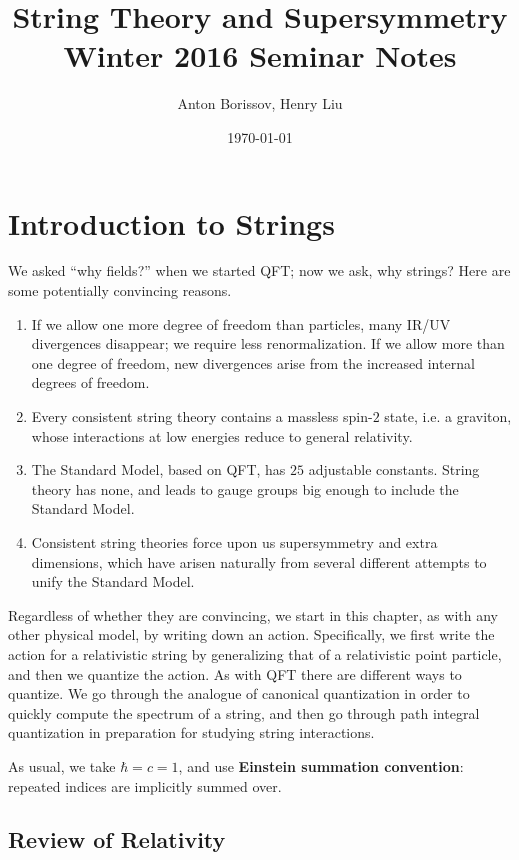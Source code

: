 \documentclass{report}
\title{String Theory and Supersymmetry\\Winter 2016 Seminar Notes}
\author{Anton Borissov, Henry Liu}
\date{\today}
\theoremstyle{plain}
\theoremstyle{definition}
\theoremstyle{remark}
\begin{document}
\hypersetup{pageanchor=false}
\maketitle
\hypersetup{pageanchor=true}

\tableofcontents

\chapter{Introduction to Strings}

We asked ``why fields?'' when we started QFT; now we ask, why strings?
Here are some potentially convincing reasons.
\begin{enumerate}
\item If we allow one more degree of freedom than particles, many
  IR/UV divergences disappear; we require less renormalization. If we
  allow more than one degree of freedom, new divergences arise from
  the increased internal degrees of freedom.
\item Every consistent string theory contains a massless spin-$2$
  state, i.e. a graviton, whose interactions at low energies reduce to
  general relativity.
\item The Standard Model, based on QFT, has $25$ adjustable constants.
  String theory has none, and leads to gauge groups big enough to
  include the Standard Model.
\item Consistent string theories force upon us supersymmetry and
  extra dimensions, which have arisen naturally from several different
  attempts to unify the Standard Model.
\end{enumerate}

Regardless of whether they are convincing, we start in this chapter,
as with any other physical model, by writing down an action.
Specifically, we first write the action for a relativistic string by
generalizing that of a relativistic point particle, and then we
quantize the action. As with QFT there are different ways to quantize.
We go through the analogue of canonical quantization in order to
quickly compute the spectrum of a string, and then go through path
integral quantization in preparation for studying string interactions.

As usual, we take $\hbar = c = 1$, and use {\bf Einstein summation
  convention}: repeated indices are implicitly summed over.

\section{Review of Relativity}
\end{document}
